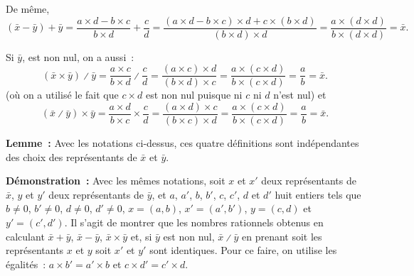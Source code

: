 De même, 
\begin{equation*}
    (\bar{x} - \bar{y}) + \bar{y} 
        = \frac{a \times d - b \times c}{b \times d} + \frac{c}{d}
        = \frac{(a \times d - b \times c) \times d + c \times (b \times d)}{(b \times d) \times d}
        = \frac{a \times (d \times d)}{b \times (d \times d)}
        = \bar{x} .
\end{equation*}

Si $\bar{y}$, est non nul, on a aussi : 
\begin{equation*}
    (\bar{x} \times \bar{y}) \divslash \bar{y} 
        = \frac{a \times c}{b \times d} \divslash \frac{c}{d}
        = \frac{(a \times c) \times d}{(b \times d) \times c} 
        = \frac{a \times (c \times d)}{b \times (c \times d)} 
        = \frac{a}{b}
        = \bar{x}.
\end{equation*}
(où on a utilisé le fait que $c \times d$ est non nul puisque ni $c$ ni $d$ n'est nul)
et
\begin{equation*}
    (\bar{x} \divslash \bar{y}) \times \bar{y} 
        = \frac{a \times d}{b \times c} \times \frac{c}{d}
        = \frac{(a \times d) \times c}{(b \times c) \times d}
        = \frac{a \times (c \times d)}{b \times (c \times d)} 
        = \frac{a}{b}
        = \bar{x}.
\end{equation*}

\done

\medskip

\noindent\textbf{Lemme :} Avec les notations ci-dessus, ces quatre définitions sont indépendantes des choix des représentants de $\bar{x}$ et $\bar{y}$.

\medskip

\noindent\textbf{Démonstration :} Avec les mêmes notations, soit $x$ et $x'$ deux représentants de $\bar{x}$, $y$ et $y'$ deux représentants de $\bar{y}$, et $a$, $a'$, $b$, $b'$, $c$, $c'$, $d$ et $d'$ huit entiers tels que $b \neq 0$, $b' \neq 0$, $d \neq 0$, $d' \neq 0$, $x = (a, b)$, $x' = (a', b')$, $y = (c, d)$ et $y' = (c', d')$. 
Il s'agit de montrer que les nombres rationnels obtenus en calculant $\bar{x} + \bar{y}$, $\bar{x} - \bar{y}$, $\bar{x} \times \bar{y}$ et, si $\bar{y}$ est non nul, $\bar{x} \divslash \bar{y}$ en prenant soit les représentants $x$ et $y$ soit $x'$ et $y'$ sont identiques.
Pour ce faire, on utilise les égalités : $a \times b' = a' \times b$ et $c \times d' = c' \times d$.

